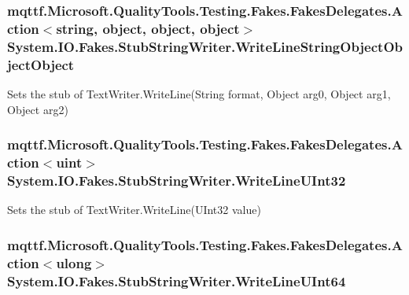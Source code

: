 \hypertarget{class_system_1_1_i_o_1_1_fakes_1_1_stub_string_writer_a90b306cf5a44d13af25176f5ec18dcc0}{
\subsubsection[{Write\-Line\-String\-Object\-Object\-Object}]{\setlength{\rightskip}{0pt plus 5cm}mqttf.\-Microsoft.\-Quality\-Tools.\-Testing.\-Fakes.\-Fakes\-Delegates.\-Action$<$string, object, object, object$>$ System.\-I\-O.\-Fakes.\-Stub\-String\-Writer.\-Write\-Line\-String\-Object\-Object\-Object}}\label{class_system_1_1_i_o_1_1_fakes_1_1_stub_string_writer_a90b306cf5a44d13af25176f5ec18dcc0}


Sets the stub of Text\-Writer.\-Write\-Line(\-String format, Object arg0, Object arg1, Object arg2)

\hypertarget{class_system_1_1_i_o_1_1_fakes_1_1_stub_string_writer_a3610bc2aa7347aff8495664a0f911cc3}{
\subsubsection[{Write\-Line\-U\-Int32}]{\setlength{\rightskip}{0pt plus 5cm}mqttf.\-Microsoft.\-Quality\-Tools.\-Testing.\-Fakes.\-Fakes\-Delegates.\-Action$<$uint$>$ System.\-I\-O.\-Fakes.\-Stub\-String\-Writer.\-Write\-Line\-U\-Int32}}\label{class_system_1_1_i_o_1_1_fakes_1_1_stub_string_writer_a3610bc2aa7347aff8495664a0f911cc3}


Sets the stub of Text\-Writer.\-Write\-Line(\-U\-Int32 value)

\hypertarget{class_system_1_1_i_o_1_1_fakes_1_1_stub_string_writer_ad1536e8899b3f0e7a192cfa3ede55462}{
\subsubsection[{Write\-Line\-U\-Int64}]{\setlength{\rightskip}{0pt plus 5cm}mqttf.\-Microsoft.\-Quality\-Tools.\-Testing.\-Fakes.\-Fakes\-Delegates.\-Action$<$ulong$>$ System.\-I\-O.\-Fakes.\-Stub\-String\-Writer.\-Write\-Line\-U\-Int64}}\label{class_system_1_1_i_o_1_1_fakes_1_1_stub_string_writer_ad1536e8899b3f0e7a192cfa3ede55462}



